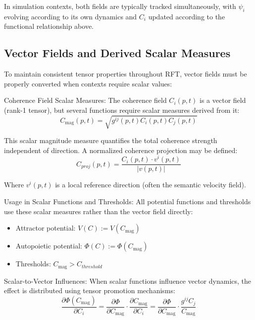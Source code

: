 In simulation contexts, both fields are typically tracked simultaneously, with \(\psi_i\) evolving according to its own dynamics and \(C_i\) updated according to the functional relationship above.

\subsection{Vector Fields and Derived Scalar Measures}

To maintain consistent tensor properties throughout RFT, vector fields must be properly converted when contexts require scalar values:

Coherence Field Scalar Measures:
The coherence field \(C_i(p,t)\) is a vector field (rank-1 tensor), but several functions require scalar measures derived from it:
\begin{equation}
C_{\mathrm{mag}}(p,t) = \sqrt{g^{ij}(p,t) C_i(p,t) C_j(p,t)}
\end{equation}

This scalar magnitude measure quantifies the total coherence strength independent of direction. A normalized coherence projection may be defined:
\begin{equation}
C_{proj}(p,t) = \frac{C_i(p,t) \cdot v^i(p,t)}{|v(p,t)|}
\end{equation}

Where \(v^i(p,t)\) is a local reference direction (often the semantic velocity field).

Usage in Scalar Functions and Thresholds:
All potential functions and thresholds use these scalar measures rather than the vector field directly:
\begin{itemize}
    \item Attractor potential: \(V(C) := V(C_{\mathrm{mag}})\)
    \item Autopoietic potential: \(\Phi(C) := \Phi(C_{\mathrm{mag}})\)
    \item Thresholds: \(C_{\mathrm{mag}} > C_{threshold}\)
\end{itemize}

Scalar-to-Vector Influences:
When scalar functions influence vector dynamics, the effect is distributed using tensor promotion mechanisms:
\begin{equation}
\frac{\partial \Phi(C_{\mathrm{mag}})}{\partial C_i} = \frac{\partial \Phi}{\partial C_{\mathrm{mag}}} \cdot \frac{\partial C_{\mathrm{mag}}}{\partial C_i} = \frac{\partial \Phi}{\partial C_{\mathrm{mag}}} \cdot \frac{g^{ij}C_j}{C_{\mathrm{mag}}}
\end{equation}


